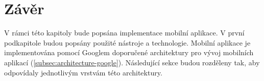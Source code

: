 \chapter{Závěr}

\begin{chapterabstract}
	V rámci této kapitoly bude popsána implementace mobilní aplikace. V první podkapitole budou popsány použité nástroje a technologie. Mobilní aplikace je implementována pomocí Googlem doporučené architektury pro vývoj mobilních aplikací (\ref{subsec:architecture-google}). Následující sekce budou rozděleny tak, aby odpovídaly jednotlivým vrstvám této architektury.
\end{chapterabstract}